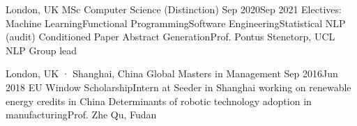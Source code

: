 

                   {London, UK}
{MSc Computer Science (Distinction)}                    {Sep 2020}{Sep 2021}
{Electives: \hspace{5pt} Machine Learning\spacedot Functional Programming\spacedot Software Engineering\spacedot Statistical NLP (audit)}
{Conditioned Paper Abstract Generation}{Prof. Pontus Stenetorp, UCL NLP Group lead}


   {London, UK · Shanghai, China}
{Global Masters in Management}                          {Sep 2016}{Jun 2018}
{EU Window Scholarship\spacedot Intern at Seeder in Shanghai working on renewable energy credits in China}
{Determinants of robotic technology adoption in manufacturing}{Prof. Zhe Qu, Fudan}